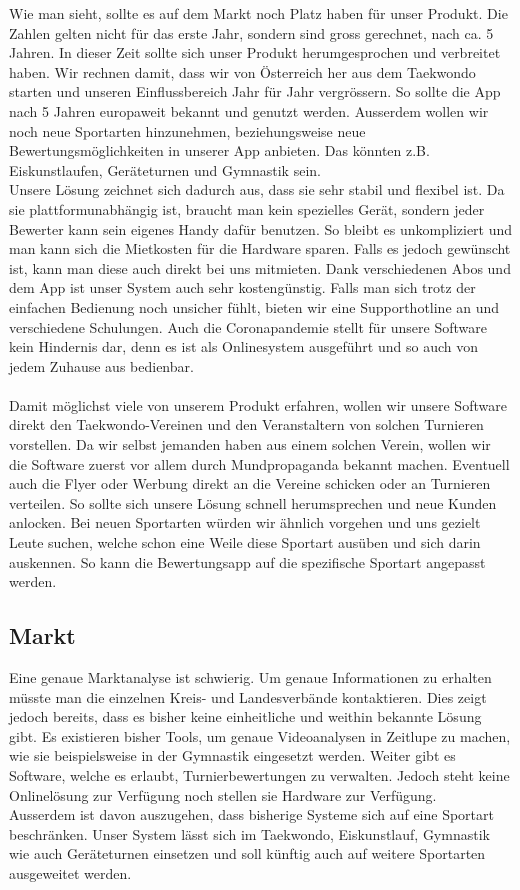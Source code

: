 Wie man sieht, sollte es auf dem Markt noch Platz haben für unser Produkt. Die Zahlen gelten nicht für das erste Jahr, sondern sind gross gerechnet, nach ca. 5 Jahren. In dieser Zeit sollte sich unser Produkt herumgesprochen und verbreitet haben. Wir rechnen damit, dass wir von Österreich her aus dem Taekwondo starten und unseren Einflussbereich Jahr für Jahr vergrössern. So sollte die App nach 5 Jahren europaweit bekannt und genutzt werden. Ausserdem wollen wir noch neue Sportarten hinzunehmen, beziehungsweise neue Bewertungsmöglichkeiten in unserer App anbieten. Das könnten z.B. Eiskunstlaufen, Geräteturnen und Gymnastik sein.\\
Unsere Lösung zeichnet sich dadurch aus, dass sie sehr stabil und flexibel ist. Da sie plattformunabhängig ist, braucht man kein spezielles Gerät, sondern jeder Bewerter kann sein eigenes Handy dafür benutzen. So bleibt es unkompliziert und man kann sich die Mietkosten für die Hardware sparen. Falls es jedoch gewünscht ist, kann man diese auch direkt bei uns mitmieten. Dank verschiedenen Abos und dem App ist unser System auch sehr kostengünstig. Falls man sich trotz der einfachen Bedienung noch unsicher fühlt, bieten wir eine Supporthotline an und verschiedene Schulungen. Auch die Coronapandemie stellt für unsere Software kein Hindernis dar, denn es ist als Onlinesystem ausgeführt und so auch von jedem Zuhause aus bedienbar.\\\\
Damit möglichst viele von unserem Produkt erfahren, wollen wir unsere Software direkt den Taekwondo-Vereinen und den Veranstaltern von solchen Turnieren vorstellen. Da wir selbst jemanden haben aus einem solchen Verein, wollen wir die Software zuerst vor allem durch Mundpropaganda bekannt machen. Eventuell auch die Flyer oder Werbung direkt an die Vereine schicken oder an Turnieren verteilen. So sollte sich unsere Lösung schnell herumsprechen und neue Kunden anlocken. Bei neuen Sportarten würden wir ähnlich vorgehen und uns gezielt Leute suchen, welche schon eine Weile diese Sportart ausüben und sich darin auskennen. So kann die Bewertungsapp auf die spezifische Sportart angepasst werden. 

\subsection{Markt}
Eine genaue Marktanalyse ist schwierig. Um genaue Informationen zu erhalten müsste man die einzelnen Kreis- und Landesverbände kontaktieren. Dies zeigt jedoch bereits, dass es bisher keine einheitliche und weithin bekannte Lösung gibt. Es existieren bisher Tools, um genaue Videoanalysen in Zeitlupe zu machen, wie sie beispielsweise in der Gymnastik eingesetzt werden. Weiter gibt es Software, welche es erlaubt, Turnierbewertungen zu verwalten. Jedoch steht keine Onlinelösung zur Verfügung noch stellen sie Hardware zur Verfügung.\\  
Ausserdem ist davon auszugehen, dass bisherige Systeme sich auf eine Sportart beschränken. Unser System lässt sich im Taekwondo, Eiskunstlauf, Gymnastik wie auch Geräteturnen einsetzen und soll künftig auch auf weitere Sportarten ausgeweitet werden.  


